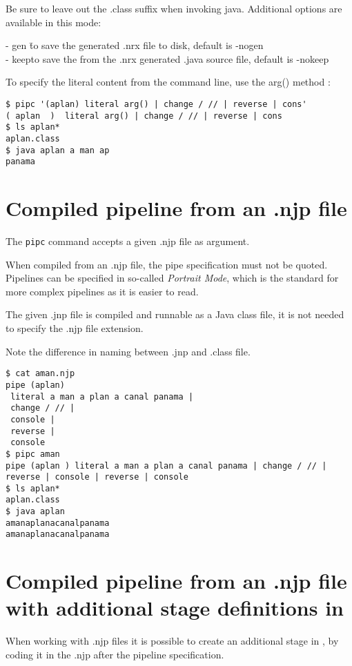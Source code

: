 Be sure to leave out the .class suffix when invoking java.
Additional options are available in this mode:
\begin{tabbing}
- gen \hspace{1em} \=to save the generated .nrx file to disk,	default is -nogen \\
- keep\>to save the from the .nrx generated .java source file, default is -nokeep\\
\end{tabbing}

To specify the literal content from the command line, use the arg() method :
\begin{lstlisting}
$ pipc '(aplan) literal arg() | change / // | reverse | cons'
( aplan  )  literal arg() | change / // | reverse | cons
$ ls aplan*
aplan.class
$ java aplan a man ap
panama
\end{lstlisting}

\section{Compiled pipeline from an .njp file}
The \texttt{pipc} command accepts a given .njp file as argument.

When compiled from an .njp file, the pipe specification must not be quoted.
Pipelines can be specified in so-called \emph{Portrait Mode}, which is the standard for more complex pipelines as it is easier to read.

The given .jnp file is compiled and runnable as a Java class file, it is not needed to specify the .njp file extension.

Note the difference in naming between .jnp and .class file.
\begin{lstlisting}
$ cat aman.njp
pipe (aplan)
 literal a man a plan a canal panama |
 change / // |
 console |
 reverse |
 console
$ pipc aman
pipe (aplan ) literal a man a plan a canal panama | change / // | reverse | console | reverse | console
$ ls aplan*
aplan.class
$ java aplan
amanaplanacanalpanama
amanaplanacanalpanama
\end{lstlisting}

\section{Compiled pipeline from an .njp file with additional stage definitions in \nr{}}
When working with .njp files it is possible to create an additional stage in \nr{}, by coding it
in the .njp after the pipeline specification.

